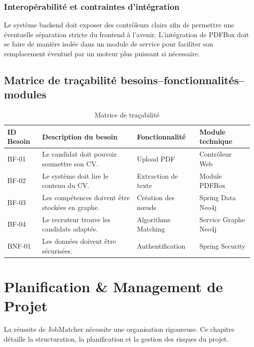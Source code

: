 \documentclass[12pt,a4paper]{report}
\begin{document}
\subsection{Interopérabilité et contraintes d'intégration}
Le système backend doit exposer des contrôleurs clairs afin de permettre une éventuelle séparation stricte du frontend à l'avenir. L'intégration de PDFBox doit se faire de manière isolée dans un module de service pour faciliter son remplacement éventuel par un moteur plus puissant si nécessaire.

\section{Matrice de traçabilité besoins–fonctionnalités–modules}

\begin{table}[h]
\centering
\begin{tabular}{|p{2cm}|p{5cm}|p{4cm}|p{3cm}|}
\hline
\textbf{ID Besoin} & \textbf{Description du besoin} & \textbf{Fonctionnalité} & \textbf{Module technique} \\
\hline
BF-01 & Le candidat doit pouvoir soumettre son CV. & Upload PDF & Contrôleur Web \\
\hline
BF-02 & Le système doit lire le contenu du CV. & Extraction de texte & Module PDFBox \\
\hline
BF-03 & Les compétences doivent être stockées en graphe. & Création des nœuds & Spring Data Neo4j \\
\hline
BF-04 & Le recruteur trouve les candidats adaptés. & Algorithme Matching & Service Graphe Neo4j \\
\hline
BNF-01 & Les données doivent être sécurisées. & Authentification & Spring Security \\
\hline
\end{tabular}
\caption{Matrice de traçabilité}
\end{table}

\chapter{Planification \& Management de Projet}

La réussite de JobMatcher nécessite une organisation rigoureuse. Ce chapitre détaille la structuration, la planification et la gestion des risques du projet.
\end{document}
